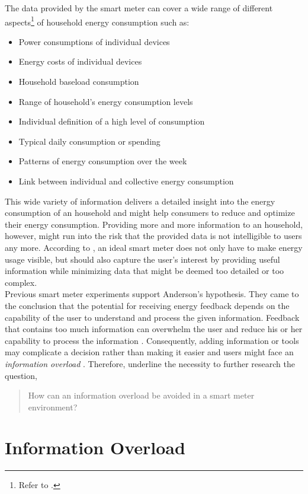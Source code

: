 The data provided by the smart meter can cover a wide range of different aspects\footnote{Refer to \citep{WillAnderson2009}.} of household energy consumption such as:
    \begin{itemize}
    \item Power consumptions of individual devices
    \item Energy costs of individual devices
    \item Household baseload consumption
    \item Range of household's energy consumption levels
    \item Individual definition of a high level of consumption
    \item Typical daily consumption or spending
    \item Patterns of energy consumption over the week
    \item Link between individual and collective energy consumption
    \end{itemize}%
This wide variety of information delivers a detailed insight into the energy consumption of an household and might help consumers to reduce and optimize their energy consumption. Providing more and more information to an household, however, might run into the risk that the provided data is not intelligible to users any more. According to \cite{WillAnderson2009}, an ideal smart meter does not only have to make energy usage visible, but should also capture the user's interest by providing useful information while minimizing data that might be deemed too detailed or too complex.\\
Previous smart meter experiments support Anderson's hypothesis. They came to the conclusion that the potential for receiving energy feedback depends on the capability of the user to understand and process the given information.
Feedback that contains too much information can overwhelm the user and reduce his or her capability to process the information \citep{Henryson2000}. Consequently,  adding information or tools may complicate a decision rather than making it easier \citep{Darby2006} and users might face an \textit{information overload} \citep{Fischer2008}. Therefore, \cite{WillAnderson2009} underline the necessity to further research the question, 
\begin{quote}
How can an information overload be avoided in a smart meter environment?
\end{quote}

\section{Information Overload}
\label{ch:Literature Review:sec:Information Overload}

